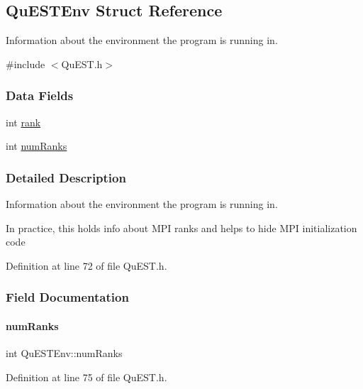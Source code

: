 \hypertarget{structQuESTEnv}{}\subsection{Qu\+E\+S\+T\+Env Struct Reference}
\label{structQuESTEnv}


Information about the environment the program is running in.  




{\ttfamily \#include $<$Qu\+E\+S\+T.\+h$>$}

\subsubsection*{Data Fields}
\begin{DoxyCompactItemize}
\item 
int \mbox{\hyperlink{structQuESTEnv_aa648bb336cf8598467cb62db00b9cee8}{rank}}
\item 
int \mbox{\hyperlink{structQuESTEnv_af22aacd7c9905accae28484785c193b4}{num\+Ranks}}
\end{DoxyCompactItemize}


\subsubsection{Detailed Description}
Information about the environment the program is running in. 

In practice, this holds info about M\+PI ranks and helps to hide M\+PI initialization code 

Definition at line 72 of file Qu\+E\+S\+T.\+h.



\subsubsection{Field Documentation}
\mbox{\label{structQuESTEnv_af22aacd7c9905accae28484785c193b4}} 
\paragraph{\texorpdfstring{num\+Ranks}{numRanks}}
{\footnotesize\ttfamily int Qu\+E\+S\+T\+Env\+::num\+Ranks}



Definition at line 75 of file Qu\+E\+S\+T.\+h.

